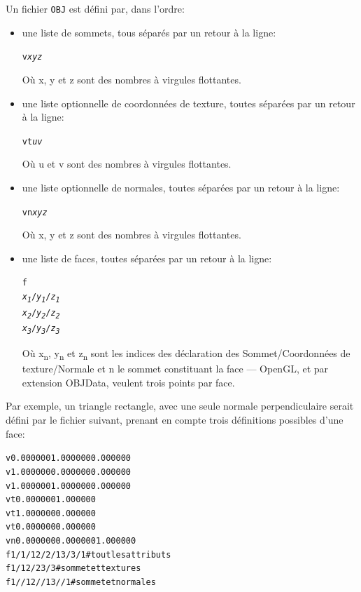\documentclass[pdftex, 11pt, a4paper, titlepage]{article}
\begin{document}
Un fichier \texttt{OBJ} est défini par, dans l'ordre:
\begin{itemize}

\item une liste de sommets, tous séparés par un retour à la ligne:
  \begin{alltt}
    v \emph{x} \emph{y} \emph{z}
  \end{alltt}
  Où x, y et z sont des nombres à virgules flottantes.

\item une liste optionnelle de coordonnées de texture, toutes séparées
  par un retour à la ligne:
  \begin{alltt}
    vt \emph{u} \emph{v}
  \end{alltt}
  Où u et v sont des nombres à virgules flottantes.

\item une liste optionnelle de normales, toutes séparées par un retour
  à la ligne:
  \begin{alltt}
    vn \emph{x} \emph{y} \emph{z}
  \end{alltt}
  Où x, y et z sont des nombres à virgules flottantes.

\item une liste de faces, toutes séparées par un retour à la ligne:
  \begin{alltt}
    f
    \emph{x\textsubscript{1}}/\emph{y\textsubscript{1}}/\emph{z\textsubscript{1}}
    \emph{x\textsubscript{2}}/\emph{y\textsubscript{2}}/\emph{z\textsubscript{2}}
    \emph{x\textsubscript{3}}/\emph{y\textsubscript{3}}/\emph{z\textsubscript{3}}
  \end{alltt}
  Où x\textsubscript{n}, y\textsubscript{n} et z\textsubscript{n} sont
  les indices des déclaration des Sommet/Coordonnées de
  texture/Normale et n
  le sommet constituant la face --- OpenGL, et par extension OBJData, veulent
trois points par face.
\end{itemize}

Par exemple, un triangle rectangle, avec une seule normale
perpendiculaire serait défini par le fichier suivant, prenant en
compte trois définitions possibles d'une face:
\begin{alltt}
v 0.000000 1.000000 0.000000 
v 1.000000 0.000000 0.000000
v 1.000000 1.000000 0.000000
vt 0.000000 1.000000
vt 1.000000 0.000000
vt 0.000000 0.000000 
vn 0.000000 0.000000 1.000000
f 1/1/1 2/2/1 3/3/1 # tout les attributs 
f 1/1 2/2 3/3       # sommet et textures
f 1//1 2//1 3//1    # sommet et normales
\end{alltt}
\end{document}
